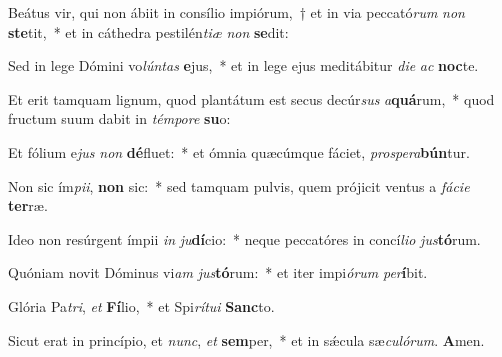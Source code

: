 \item Beátus vir, qui non ábiit in consílio impiórum,~† et in via peccató\textit{rum} \textit{non} \textbf{ste}tit,~* et in cáthedra pestilén\textit{ti}\textit{æ} \textit{non} \textbf{se}dit:
\item Sed in lege Dómini vo\textit{lún}\textit{tas} \textbf{e}jus,~* et in lege ejus meditábitur \textit{di}\textit{e} \textit{ac} \textbf{noc}te.
\item Et erit tamquam lignum, quod plantátum est secus decúr\textit{sus} \textit{a}\textbf{quá}rum,~* quod fructum suum dabit in \textit{tém}\textit{po}\textit{re} \textbf{su}o:
\item Et fólium e\textit{jus} \textit{non} \textbf{dé}fluet:~* et ómnia quæcúmque fáciet, \textit{pro}\textit{spe}\textit{ra}\textbf{bún}tur.
\item Non sic ím\textit{pi}\textit{i}, \textbf{non} sic:~* sed tamquam pulvis, quem prójicit ventus a \textit{fá}\textit{ci}\textit{e} \textbf{ter}ræ.
\item Ideo non resúrgent ímpii \textit{in} \textit{ju}\textbf{dí}cio:~* neque peccatóres in concí\textit{li}\textit{o} \textit{jus}\textbf{tó}rum.
\item Quóniam novit Dóminus vi\textit{am} \textit{jus}\textbf{tó}rum:~* et iter impi\textit{ó}\textit{rum} \textit{per}\textbf{í}bit.
\item Glória Pa\textit{tri}, \textit{et} \textbf{Fí}lio,~* et Spi\textit{rí}\textit{tu}\textit{i} \textbf{Sanc}to.
\item Sicut erat in princípio, et \textit{nunc}, \textit{et} \textbf{sem}per,~* et in sǽcula sæ\textit{cu}\textit{ló}\textit{rum}. \textbf{A}men.

